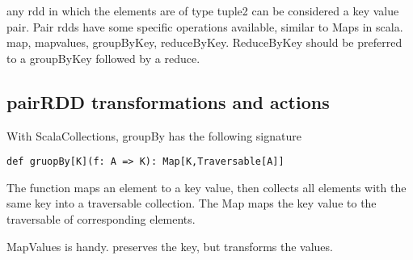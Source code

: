 any rdd in which the elements are of type tuple2 can be considered a key value pair. Pair rdds have some specific operations available, similar to Maps in scala. map, mapvalues, groupByKey, reduceByKey. ReduceByKey should be preferred to a groupByKey followed by a reduce.

\subsection{pairRDD transformations and actions}

With ScalaCollections, groupBy has the following signature
\begin{lstlisting}
def gruopBy[K](f: A => K): Map[K,Traversable[A]]
\end{lstlisting}

The function maps an element to a key value, then collects all elements with the same key into a traversable collection. The Map maps the key value to the traversable of corresponding elements.

MapValues is handy. preserves the key, but transforms the values.